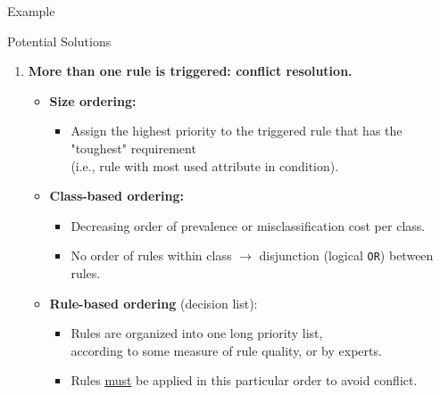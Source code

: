 \begin{frame}{Example}
\begin{itemize}

	\end{itemize}

\end{frame}

\begin{frame}{Potential Solutions}
	\begin{enumerate}
		\item \textbf{More than one rule is triggered: {\color{airforceblue}conflict resolution}.}
		      \begin{itemize}
			      \item \textbf{\color{airforceblue}Size ordering:}
			            \begin{itemize}
				            \item Assign the highest priority to the triggered rule that has the "toughest" requirement \\ (i.e., rule with most used attribute in condition).
			            \end{itemize}
			      \item \textbf{\color{airforceblue}Class-based ordering:}
			            \begin{itemize}
				            \item Decreasing order of prevalence or misclassification cost per class.
				            \item No order of rules within class $\rightarrow$ disjunction (logical \texttt{OR}) between rules.
			            \end{itemize}
			      \item \textbf{\color{airforceblue}Rule-based ordering} (decision list):
			            \begin{itemize}
				            \item Rules are organized into one long priority list,\\
				                  according to some measure of rule quality, or by experts.
				            \item Rules \underline{must} be applied in this particular order to avoid conflict.

\end{itemize}
\end{itemize}
\end{enumerate}
\end{frame}
